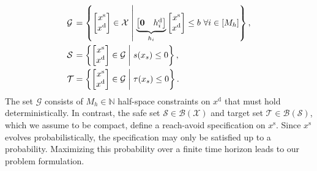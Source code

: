 \documentclass{IEEEtran}
\begin{document}
\begin{align*}
    &\mathcal{G}&&
    \hspace{-1em}=\left\{\begin{bmatrix}
    x^{\text{s}} \\ x^{\text{d}} 
\end{bmatrix}\in\mathcal{X}\; \middle|\;\underbrace{\begin{bmatrix}
    \mathbf{0} & h_i^{\text{d}}
\end{bmatrix}}_{h_i}\begin{bmatrix}
    x^{\text{s}} \\ x^{\text{d}} 
\end{bmatrix}\leq b \ \forall i\in[M_h]\right\}, \\
&\mathcal{S}&&\hspace{-1em}=\left\{\begin{bmatrix}
    x^{\text{s}} \\ x^{\text{d}} 
\end{bmatrix}\in\mathcal{G}\; \middle|\;s(x_s)\leq 0\right\}, 
\\
&\mathcal{T}&&\hspace{-1em}=\left\{\begin{bmatrix}
    x^{\text{s}} \\ x^{\text{d}} 
\end{bmatrix}\in\mathcal{G}\; \middle|\;\tau(x_s)\leq 0\right\}.
\end{align*}
The set $\mathcal{G}$ consists of $M_h\in\mathbb{N}$ half-space constraints on $x^{\text{d}}$ that must hold deterministically. In contrast, the safe set $\mathcal{S}\in\mathcal{B}(\mathcal{X})$ and target set $\mathcal{T}\in\mathcal{B}(\mathcal{S})$, which we assume to be compact, define a reach-avoid specification on $x^{\text{s}}$. Since $x^{\text{s}}$ evolves probabilistically, the specification may only be satisfied up to a probability. Maximizing this probability over a finite time horizon leads to our problem formulation.

\end{document}
